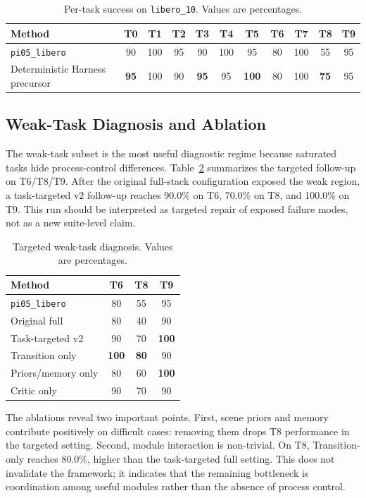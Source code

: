 \documentclass[runningheads]{waica}
\begin{document}
\begin{table}
\caption{Per-task success on \texttt{libero\_10}. Values are percentages.}
\label{tab:per_task}
\centering
\small
\begin{tabular}{lcccccccccc}
\toprule
Method & T0 & T1 & T2 & T3 & T4 & T5 & T6 & T7 & T8 & T9 \\
\midrule
\texttt{pi05\_libero} & 90 & 100 & 95 & 90 & 100 & 95 & 80 & 100 & 55 & 95 \\
Deterministic Harness precursor & \textbf{95} & 100 & 90 & \textbf{95} & 95 & \textbf{100} & 80 & 100 & \textbf{75} & 95 \\
\bottomrule
\end{tabular}
\end{table}

\subsection{Weak-Task Diagnosis and Ablation}

The weak-task subset is the most useful diagnostic regime because saturated tasks hide process-control differences.
Table~\ref{tab:weak} summarizes the targeted follow-up on T6/T8/T9.
After the original full-stack configuration exposed the weak region, a task-targeted v2 follow-up reaches 90.0\% on T6, 70.0\% on T8, and 100.0\% on T9.
This run should be interpreted as targeted repair of exposed failure modes, not as a new suite-level claim.

\begin{table}
\caption{Targeted weak-task diagnosis. Values are percentages.}
\label{tab:weak}
\centering
\small
\begin{tabular}{lccc}
\toprule
Method & T6 & T8 & T9 \\
\midrule
\texttt{pi05\_libero} & 80 & 55 & 95 \\
Original full & 80 & 40 & 90 \\
Task-targeted v2 & 90 & 70 & \textbf{100} \\
Transition only & \textbf{100} & \textbf{80} & 90 \\
Priors/memory only & 80 & 60 & \textbf{100} \\
Critic only & 90 & 70 & 90 \\
\bottomrule
\end{tabular}
\end{table}

The ablations reveal two important points.
First, scene priors and memory contribute positively on difficult cases: removing them drops T8 performance in the targeted setting.
Second, module interaction is non-trivial.
On T8, Transition-only reaches 80.0\%, higher than the task-targeted full setting.
This does not invalidate the framework; it indicates that the remaining bottleneck is coordination among useful modules rather than the absence of process control.
\end{document}
